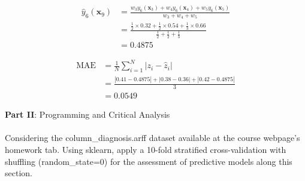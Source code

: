 \documentclass[12pt]{article}
\begin{document}
\begin{enumerate}[leftmargin=\labelsep]
\begin{enumerate}
        \begin{equation}
        \begin{split}
            \hat{y}_{6}(\mathbf{x}_9) &= \frac{w_3y_{6}(\mathbf{x}_3) + w_4y_{6}(\mathbf{x}_4) + w_5y_{6}(\mathbf{x}_5)}{w_3 + w_4 + w_5} \\
            &= \frac{\frac{1}{2} \times 0.32 + \frac{1}{2} \times 0.54 + \frac{1}{3} \times 0.66}{\frac{1}{2} + \frac{1}{2} + \frac{1}{3}} \\
            &= 0.4875
        \end{split}
        \end{equation}

        \begin{equation}
        \begin{split}            
            \textrm{MAE} &= \frac{1}{N}\sum_{i = 1}^N |z_i - \hat{z}_i| \\
            &=\frac{|0.41 - 0.4875| + |0.38 - 0.36| + |0.42-0.4875|}{3} \\
            &=0.0549
        \end{split}
        \end{equation}
        
    \end{enumerate}
\end{enumerate}

\vskip 1cm

\large{\textbf{Part II}: Programming and Critical Analysis}\normalsize

\paragraph{}Considering the column\_diagnosis.arff dataset available at the course webpage’s homework tab.
Using sklearn, apply a 10-fold stratified cross-validation with shuffling (random\_state=0) for the
assessment of predictive models along this section.
\end{document}
